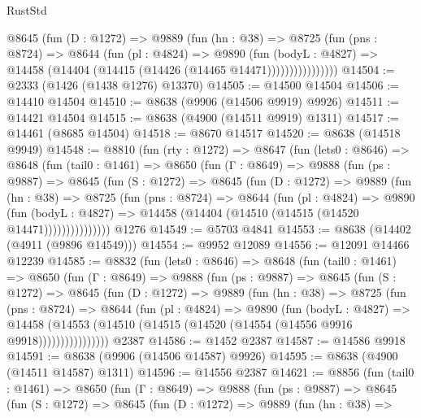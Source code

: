 \begin{lexlean}{RustStd}
\begin{coremodule}
                @8645
                  (fun (D : @1272) =>
                  @9889
                    (fun (hn : @38) =>
                    @8725
                      (fun (pns : @8724) =>
                      @8644
                        (fun (pl : @4824) =>
                        @9890
                          (fun (bodyL : @4827) =>
                          @14458 (@14404 (@14415 (@14426 (@14465 @14471))))))))))))))))
@14504 := @2333 (@1426 (@1438 @1276) @13370)
@14505 := @14500 @14504
@14506 := @14410 @14504
@14510 := @8638 (@9906 (@14506 @9919) @9926)
@14511 := @14421 @14504
@14515 := @8638 (@4900 (@14511 @9919) @1311)
@14517 := @14461 (@8685 @14504)
@14518 := @8670 @14517
@14520 := @8638 (@14518 @9949)
@14548 := @8810
    (fun (rty : @1272) =>
    @8647
      (fun (lets0 : @8646) =>
      @8648
        (fun (tail0 : @1461) =>
        @8650
          (fun (Γ : @8649) =>
          @9888
            (fun (ps : @9887) =>
            @8645
              (fun (S : @1272) =>
              @8645
                (fun (D : @1272) =>
                @9889
                  (fun (hn : @38) =>
                  @8725
                    (fun (pns : @8724) =>
                    @8644
                      (fun (pl : @4824) =>
                      @9890
                        (fun (bodyL : @4827) =>
                        @14458 (@14404 (@14510 (@14515 (@14520 @14471)))))))))))))))
    @1276
@14549 := @5703 @4841
@14553 := @8638 (@14402 (@4911 (@9896 @14549)))
@14554 := @9952 @12089
@14556 := @12091 @14466 @12239
@14585 := @8832
    (fun (lets0 : @8646) =>
    @8648
      (fun (tail0 : @1461) =>
      @8650
        (fun (Γ : @8649) =>
        @9888
          (fun (ps : @9887) =>
          @8645
            (fun (S : @1272) =>
            @8645
              (fun (D : @1272) =>
              @9889
                (fun (hn : @38) =>
                @8725
                  (fun (pns : @8724) =>
                  @8644
                    (fun (pl : @4824) =>
                    @9890
                      (fun (bodyL : @4827) =>
                      @14458
                        (@14553 (@14510 (@14515 (@14520 (@14554 (@14556 @9916 @9918))))))))))))))))
    @2387
@14586 := @1452 @2387
@14587 := @14586 @9918
@14591 := @8638 (@9906 (@14506 @14587) @9926)
@14595 := @8638 (@4900 (@14511 @14587) @1311)
@14596 := @14556 @2387
@14621 := @8856
    (fun (tail0 : @1461) =>
    @8650
      (fun (Γ : @8649) =>
      @9888
        (fun (ps : @9887) =>
        @8645
          (fun (S : @1272) =>
          @8645
            (fun (D : @1272) =>
            @9889
              (fun (hn : @38) =>

\end{coremodule}
\end{lexlean}
